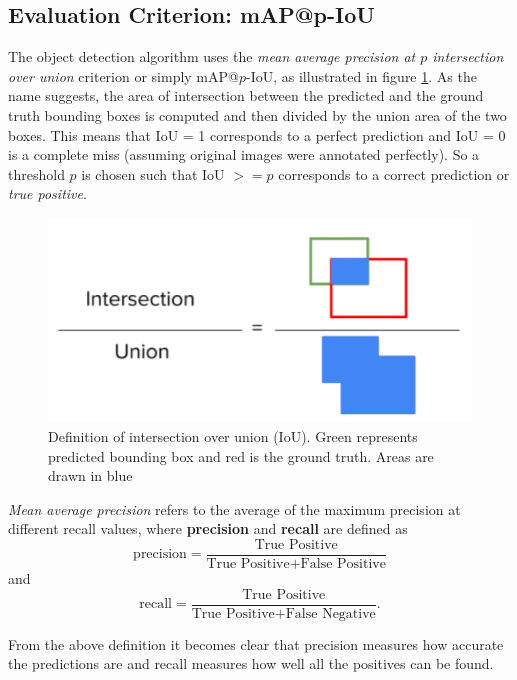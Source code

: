 		\subsection{Evaluation Criterion: mAP@p-IoU}
		  The object detection algorithm uses the \textit{mean average precision at $p$ intersection over union} criterion or simply mAP@$p$-IoU, as illustrated in figure \ref{fig:iou_def}. As the  name suggests, the area of intersection between the predicted and the ground truth bounding boxes is computed and then divided by the union area of the two boxes. This means that IoU = 1 corresponds to a perfect prediction and IoU = 0 is a complete miss (assuming original images were annotated perfectly). So a threshold $p$ is chosen such that IoU $>= p$ corresponds to a correct prediction or \textit{true positive}. 		  

		\begin{figure}
			\centering
			\includegraphics[scale=.5]{images/iou_def.png}
			\caption{Definition of intersection over union (IoU). Green represents predicted bounding box and red is the ground truth. Areas are drawn in blue}
			\label{fig:iou_def}
		\end{figure}				  
		  
		  \textit{Mean average precision} refers to the average of the maximum precision at different recall values, where \textbf{precision} and \textbf{recall} are defined as
		  \begin{equation}
		  	\text{precision} = \dfrac{\text{True Positive}}{ \text{True Positive} + \text{False Positive}}
		  \end{equation}
		  and
		  \begin{equation}
		  	\text{recall} = \dfrac{\text{True Positive}}{ \text{True Positive} + \text{False Negative}}.
		  \end{equation}

		From the above definition it becomes clear that precision measures how accurate the predictions are and recall measures how well all the positives can be found.
		
